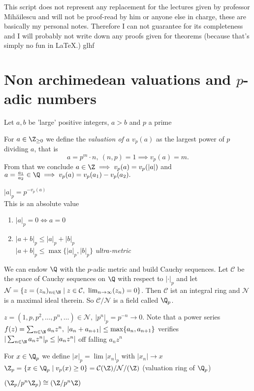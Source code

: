 \documentclass{jvfscript}
\begin{document}
	\frontmatter
	\maketitle
	
\tableofcontents
\newpage
\thispagestyle{plain}
This script does not represent any replacement for the lectures given by professor Mih\u{a}ilescu and will not be proof-read by him or anyone else in charge, these are basically my personal notes. Therefore I can not guarantee for its completeness and I will probably not write down any proofs given for theorems (because that's simply no fun in \LaTeX.)\hspace{\fill} glhf
\newpage
\mainmatter	
{}			%
	
	
	\section{Non archimedean valuations and $p$-adic numbers}
		Let $a,b$ be 'large' positive integers, $a > b$ and $p$ a prime
	\begin{defn}
		For $a \in \Z_{\geq 0}$ we define the \emph{valuation of $a$} $v_p(a)$ as the largest power of $p$ dividing $a$, that is
		\[ a = p^m \cdot n,\ (n,p) = 1 \implies v_p(a) = m. \]
		From that we conclude $ a \in \Z \implies v_p(a) = v_p(|a|) $ and $ a = \frac{a_1}{a_2} \in \Q \implies v_p(a) = v_p(a_1) - v_p(a_2). $
	\end{defn}
	$ |a|_p = p^{-v_p(a)} $\\
	This is an absolute value
	\begin{enumerate}
		\item $|a|_p = 0 \iff a = 0$
		\item $|a+b|_p \leq |a|_p+|b|_p$\\
		$|a+b|_p \leq \max\{|a|_p,|b|_p\}$ \emph{ultra-metric}
	\end{enumerate}
	We can endow $\Q$ with the $p$-adic metric and build Cauchy sequences. Let $\mathcal{C}$ be the space of Cauchy sequences on $\Q$ with respect to $|\cdot|_p$ and let $\mathcal{N} = \{z = (z_n)_{n \in \N} \mid z \in \mathcal{C},\ \lim_{n \to \infty}(z_n) = 0\}$. Then $\mathcal{C}$ ist an integral ring and $\mathcal{N}$ is a maximal ideal therein. So $\mathcal{C}/\mathcal{N}$ is a field called $\Q_p$.
	\begin{exmp}
		$z = (1,p,p^2,\dotsc,p^n,\dotsc) \in \mathcal{N},\ |p^n|_p = p^{-n} \to 0$. Note that a power series $ f(z) = \sum_{n \in \N} a_n z^n,\ |a_n + a_{n+1}| \leq \max\{a_n,a_{n+1}\} $ verifies $ |\sum_{n \in \N} a_nz^n|_p \leq |a_nz^n| $ off falling $ a_nz^n $
	\end{exmp}
	\begin{defn}
		For $ x \in \Q_p $ we define $ |x|_p = \lim|x_n|_p $ with $|x_n| \to x$\\
		$ \Z_p = \{x \in \Q_p \mid v_p(x) \geq 0\} = \mathcal{C}(\Z)/\mathcal{N}/(\Z) $ (valuation ring of $\Q_p$)
	\end{defn}	
	$ \left( \Z_p/p^n\Z_p \right) \cong \left( \Z/p^n\Z \right) $
	
	
	
	
	
	
	
\end{document}

